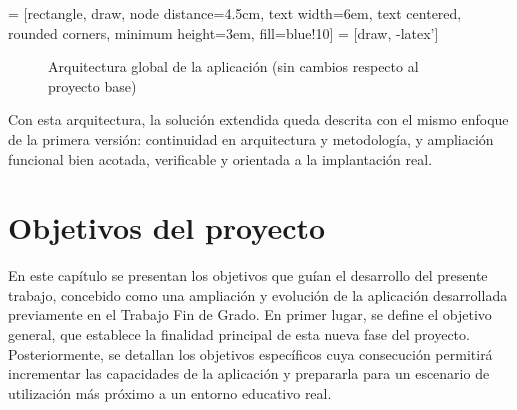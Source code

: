 = [rectangle, draw, node distance=4.5cm,
    text width=6em, text centered, rounded corners, minimum height=3em, fill=blue!10]
 = [draw, -latex']

\begin{figure}[H]
\centering
{}
\caption{Arquitectura global de la aplicación (sin cambios respecto al proyecto base)}
\label{fig:arquitectura_global_ext}
\end{figure}

Con esta arquitectura, la solución extendida queda descrita con el mismo enfoque de la primera versión: continuidad en arquitectura y metodología, y ampliación funcional bien acotada, verificable y orientada a la implantación real.


\chapter{Objetivos del proyecto}
\label{chap:objetivos}

En este capítulo se presentan los objetivos que guían el desarrollo del presente trabajo, concebido como una ampliación y evolución de la aplicación desarrollada previamente en el Trabajo Fin de Grado. En primer lugar, se define el objetivo general, que establece la finalidad principal de esta nueva fase del proyecto. Posteriormente, se detallan los objetivos específicos cuya consecución permitirá incrementar las capacidades de la aplicación y prepararla para un escenario de utilización más próximo a un entorno educativo real.

